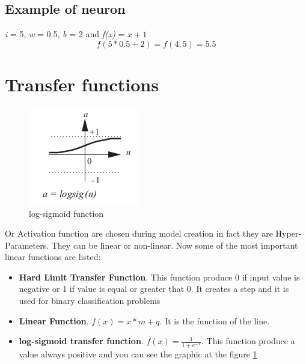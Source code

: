 \documentclass[12pt,a4paper,twoside,openright]{scrbook}
\begin{document}
\subsection{Example of neuron}
\textit{i} = 5, \textit{w} = 0.5, \textit{b} = 2 and \textit{f(x)} = $x + 1$  
\begin{equation}
f(5*0.5 + 2) = f(4,5) = 5.5
\end{equation}

\section{Transfer functions}
\begin{figure}
    \centering
    \includegraphics[scale=0.65]{img/log-sigmoid-function.png}
    \caption{log-sigmoid function}
    \label{img:log-sigmoid}
\end{figure}{}
Or Activation function are chosen during model creation in fact they are Hyper-Parameters. They can be linear or non-linear. Now some of the most important linear functions are listed:
\begin{itemize}
\item \textbf{Hard Limit Transfer Function}. This function produce 0 if input value is negative or 1 if value is equal or greater that 0. It creates a step and it is used for binary classification problems
\item \textbf{Linear Function}. $f(x) = x*m +q$. It is the function of the line.
\item \textbf{log-sigmoid transfer function}. $f(x) = \frac{1}{1+e^{-x}}$. This function produce a value always positive and you can see the graphic at the figure \ref{img:log-sigmoid}
\end{itemize}
\end{document}
